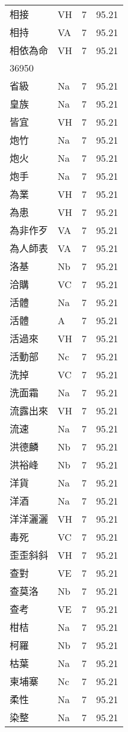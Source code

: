 \documentclass[twocolumn]{book}
\begin{document}
\begin{supertabular}{llrr}
相接 & VH & 7 &  95.21\\
相持 & VA & 7 &  95.21\\
相依為命 & VH & 7 &  95.21\\
36950\\
省級 & Na & 7 &  95.21\\
皇族 & Na & 7 &  95.21\\
皆宜 & VH & 7 &  95.21\\
炮竹 & Na & 7 &  95.21\\
炮火 & Na & 7 &  95.21\\
炮手 & Na & 7 &  95.21\\
為業 & VH & 7 &  95.21\\
為患 & VH & 7 &  95.21\\
為非作歹 & VA & 7 &  95.21\\
為人師表 & VA & 7 &  95.21\\
洛基 & Nb & 7 &  95.21\\
洽購 & VC & 7 &  95.21\\
活體 & Na & 7 &  95.21\\
活體 & A & 7 &  95.21\\
活過來 & VH & 7 &  95.21\\
活動部 & Nc & 7 &  95.21\\
洗掉 & VC & 7 &  95.21\\
洗面霜 & Na & 7 &  95.21\\
流露出來 & VH & 7 &  95.21\\
流速 & Na & 7 &  95.21\\
洪德麟 & Nb & 7 &  95.21\\
洪裕峰 & Nb & 7 &  95.21\\
洋貨 & Na & 7 &  95.21\\
洋酒 & Na & 7 &  95.21\\
洋洋灑灑 & VH & 7 &  95.21\\
毒死 & VC & 7 &  95.21\\
歪歪斜斜 & VH & 7 &  95.21\\
查對 & VE & 7 &  95.21\\
查莫洛 & Nb & 7 &  95.21\\
查考 & VE & 7 &  95.21\\
柑桔 & Na & 7 &  95.21\\
柯羅 & Nb & 7 &  95.21\\
枯葉 & Na & 7 &  95.21\\
柬埔寨 & Nc & 7 &  95.21\\
柔性 & Na & 7 &  95.21\\
染整 & Na & 7 &  95.21\\

\end{supertabular}
\end{document}
